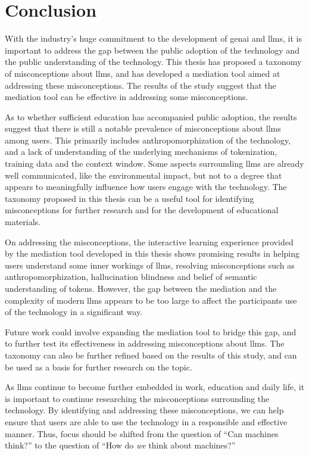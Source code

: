 \chapter{Conclusion}

With the industry's huge commitment to the development of \gls{genai} and \gls{llms}, it is important to address the gap between the public adoption of the technology and the public understanding of the technology. This thesis has proposed a taxonomy of misconceptions about \gls{llms}, and has developed a mediation tool aimed at addressing these misconceptions. The results of the study suggest that the mediation tool can be effective in addressing some misconceptions.

As to whether sufficient education has accompanied public adoption, the results suggest that there is still a notable prevalence of misconceptions about \gls{llms} among users. This primarily includes anthropomorphization of the technology, and a lack of understanding of the underlying mechanisms of tokenization, training data and the context window. Some aspects surrounding \gls{llms} are already well communicated, like the environmental impact, but not to a degree that appears to meaningfully influence how users engage with the technology.
The taxonomy proposed in this thesis can be a useful tool for identifying misconceptions for further research and for the development of educational materials.

On addressing the misconceptions, the interactive learning experience provided by the mediation tool developed in this thesis shows promising results in helping users understand some inner workings of \gls{llms}, resolving misconceptions such as anthropomorphization, hallucination blindness and belief of semantic understanding of tokens. However, the gap between the mediation and the complexity of modern \gls{llms} appears to be too large to affect the participants use of the technology in a significant way. 

Future work could involve expanding the mediation tool to bridge this gap, and to further test its effectiveness in addressing misconceptions about \gls{llms}. The taxonomy can also be further refined based on the results of this study, and can be used as a basis for further research on the topic.

As \gls{llms} continue to become further embedded in work, education and daily life, it is important to continue researching the misconceptions surrounding the technology. By identifying and addressing these misconceptions, we can help ensure that users are able to use the technology in a responsible and effective manner. Thus, focus should be shifted from the question of ``Can machines think?'' to the question of ``How do \textit{we} think about machines?''